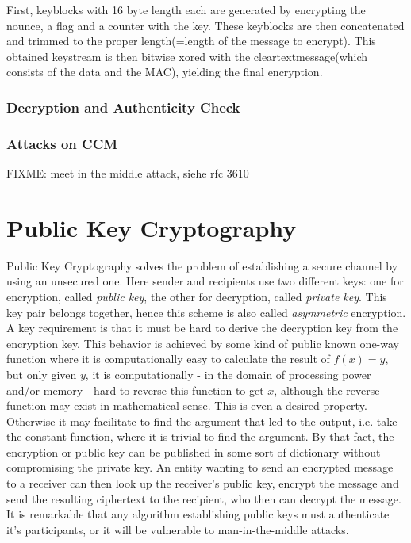 First, keyblocks with 16 byte length each are generated by encrypting the nounce, a flag and a counter with the key. These 
keyblocks are then concatenated and trimmed to the proper length(=length of the message to encrypt). This obtained keystream
is then bitwise xored with the cleartextmessage(which consists of the data and the MAC), yielding the final encryption.


\subsubsection{Decryption and Authenticity Check}

\subsubsection{Attacks on CCM}

FIXME: meet in the middle attack, siehe rfc 3610

\section{Public Key Cryptography}

Public Key Cryptography solves the problem of establishing a secure channel by using an unsecured one.
Here sender and recipients use two different keys: one for encryption, called \textit{public key}, the other
for decryption, called \textit{private key}. This key pair belongs together, hence this scheme is also called \textit{asymmetric} encryption. A key requirement
is that it must be hard
to derive the decryption key from the encryption key. This behavior is achieved by some kind of public known one-way function where it is computationally
easy to calculate the result of $f(x) = y$, but only given $y$, it is computationally - in the domain of processing power and/or memory - hard
to reverse this function to get $x$, although the reverse function may exist in mathematical sense. This is even a desired property. Otherwise
it may facilitate to find the argument that led to the output, i.e. take the constant function, where it is trivial to find the argument.
By that fact, the encryption or public key can be published in some sort of dictionary without compromising the private key. An entity wanting to
send an encrypted message to a receiver can then look up the receiver's public key, encrypt the message and send the resulting
ciphertext to the recipient, who then can decrypt the message. It is remarkable that any algorithm establishing public keys must authenticate it's 
participants, or it will be vulnerable to man-in-the-middle attacks.

